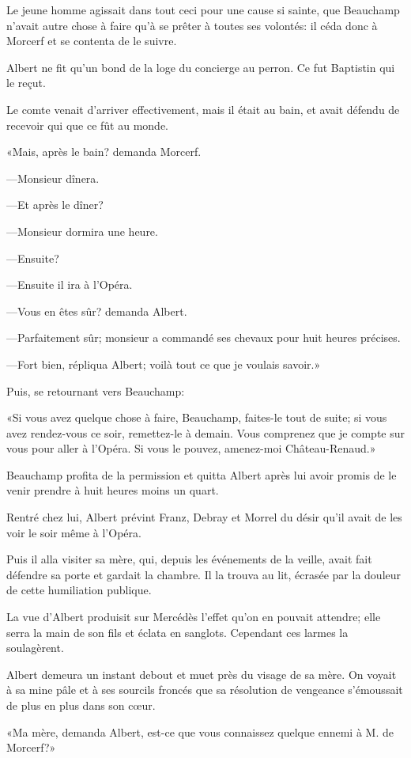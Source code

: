 Le jeune homme agissait dans tout ceci pour une cause si sainte, que Beauchamp n'avait autre chose à faire qu'à se prêter à toutes ses volontés: il céda donc à Morcerf et se contenta de le suivre. 

Albert ne fit qu'un bond de la loge du concierge au perron. Ce fut Baptistin qui le reçut. 

Le comte venait d'arriver effectivement, mais il était au bain, et avait défendu de recevoir qui que ce fût au monde. 

«Mais, après le bain? demanda Morcerf. 

—Monsieur dînera. 

—Et après le dîner? 

—Monsieur dormira une heure. 

—Ensuite? 

—Ensuite il ira à l'Opéra. 

—Vous en êtes sûr? demanda Albert. 

—Parfaitement sûr; monsieur a commandé ses chevaux pour huit heures précises. 

—Fort bien, répliqua Albert; voilà tout ce que je voulais savoir.» 

Puis, se retournant vers Beauchamp: 

«Si vous avez quelque chose à faire, Beauchamp, faites-le tout de suite; si vous avez rendez-vous ce soir, remettez-le à demain. Vous comprenez que je compte sur vous pour aller à l'Opéra. Si vous le pouvez, amenez-moi Château-Renaud.» 

Beauchamp profita de la permission et quitta Albert après lui avoir promis de le venir prendre à huit heures moins un quart. 

Rentré chez lui, Albert prévint Franz, Debray et Morrel du désir qu'il avait de les voir le soir même à l'Opéra. 

Puis il alla visiter sa mère, qui, depuis les événements de la veille, avait fait défendre sa porte et gardait la chambre. Il la trouva au lit, écrasée par la douleur de cette humiliation publique. 

La vue d'Albert produisit sur Mercédès l'effet qu'on en pouvait attendre; elle serra la main de son fils et éclata en sanglots. Cependant ces larmes la soulagèrent. 

Albert demeura un instant debout et muet près du visage de sa mère. On voyait à sa mine pâle et à ses sourcils froncés que sa résolution de vengeance s'émoussait de plus en plus dans son cœur. 

«Ma mère, demanda Albert, est-ce que vous connaissez quelque ennemi à M. de Morcerf?» 

